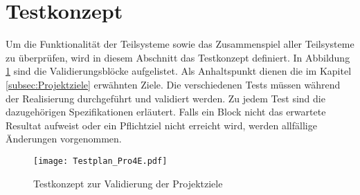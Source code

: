 \clearpage
\section{Testkonzept}\label{sec:Testkonzept}
Um die Funktionalität der Teilsysteme sowie das Zusammenspiel aller Teilsysteme zu überprüfen, wird in diesem Abschnitt das Testkonzept definiert. In Abbildung \ref{img:Testplan} sind die Validierungsblöcke aufgelistet. Als Anhaltspunkt dienen die im Kapitel \ref{subsec:Projektziele} erwähnten Ziele. Die verschiedenen Tests müssen während der Realisierung durchgeführt und validiert werden. Zu jedem Test sind die dazugehörigen Spezifikationen erläutert. Falls ein Block nicht das erwartete Resultat aufweist oder ein Pflichtziel nicht erreicht wird, werden allfällige Änderungen vorgenommen.

\begin{figure}[h]
	\centering
	\texttt{[image: Testplan\_Pro4E.pdf]}
	\caption{Testkonzept zur Validierung der Projektziele}
	\label{img:Testplan}
\end{figure} 








